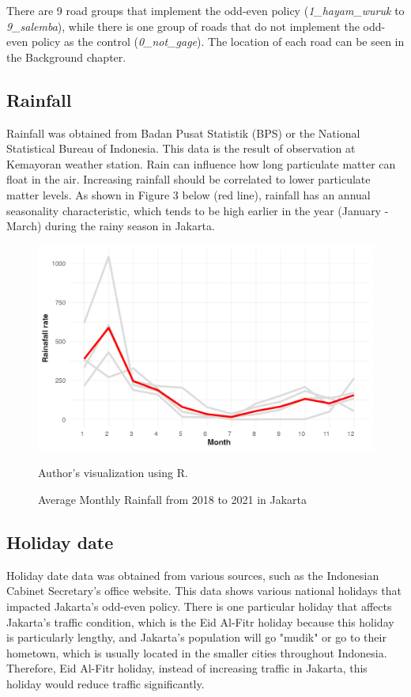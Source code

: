 \documentclass[AEJ]{AEA}
\begin{document}
There are 9 road groups that implement the odd-even policy (\textit{1\_hayam\_wuruk} to \textit{9\_salemba}), while there is one group of roads that do not implement the odd-even policy as the control (\textit{0\_not\_gage}). The location of each road can be seen in the Background chapter.


\subsection{Rainfall}

Rainfall was obtained from Badan Pusat Statistik (BPS) or the National Statistical Bureau of Indonesia. This data is the result of observation at Kemayoran weather station. Rain can influence how long particulate matter can float in the air. Increasing rainfall should be correlated to lower particulate matter levels. As shown in Figure 3 below (red line), rainfall has an annual seasonality characteristic, which tends to be high earlier in the year (January - March) during the rainy season in Jakarta.

\begin{figure}
    \centering
    \includegraphics[width=0.8\linewidth]{Graphs/rain_seasonality_graph.png}
    \caption{Average Monthly Rainfall from 2018 to 2021 in Jakarta}
    \label{Average Monthly Rainfall from 2018 to 2021 in Jakarta}
    
\begin{figurenotes}[Source]
Author's visualization using R.
\end{figurenotes}
\end{figure}


\subsection{Holiday date}

Holiday date data was obtained from various sources, such as the Indonesian Cabinet Secretary's office website. This data shows various national holidays that impacted Jakarta's odd-even policy. There is one particular holiday that affects Jakarta's traffic condition, which is the Eid Al-Fitr holiday because this holiday is particularly lengthy, and Jakarta's population will go "mudik" or go to their hometown, which is usually located in the smaller cities throughout Indonesia. Therefore, Eid Al-Fitr holiday, instead of increasing traffic in Jakarta, this holiday would reduce traffic significantly.
\end{document}
